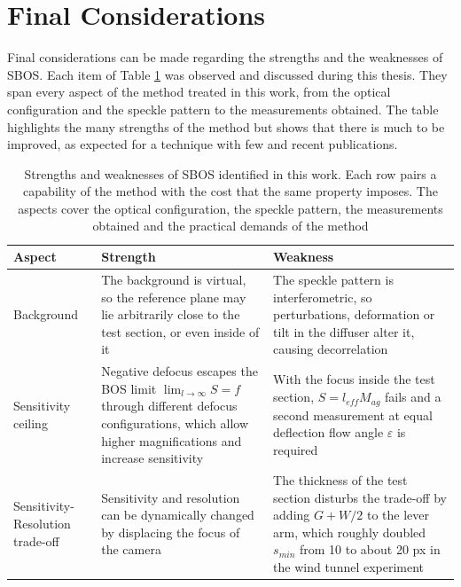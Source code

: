 \section{Final Considerations}
\label{section: Final Considerations}

Final considerations can be made regarding the strengths and the weaknesses of SBOS. Each item of Table \ref{tab: SBOS strengths and weaknesses} was observed and discussed during this thesis. They span every aspect of the method treated in this work, from the optical configuration and the speckle pattern to the measurements obtained. The table highlights the many strengths of the method but shows that there is much to be improved, as expected for a technique with few and recent publications.


\begin{table}[htbp]
    \centering
    \caption[Strengths and weaknesses of SBOS]{Strengths and weaknesses of SBOS identified in this work. Each row pairs a capability of the method with the cost that the same property imposes. The aspects cover the optical configuration, the speckle pattern, the measurements obtained and the practical demands of the method}
    \label{tab: SBOS strengths and weaknesses}
    \begin{tabularx}{\textwidth}{@{}>{\raggedright\arraybackslash}p{} >{\raggedright\arraybackslash}X >{\raggedright\arraybackslash}X@{}}
        \toprule
        Aspect & Strength & Weakness \\
        \midrule
        Background &
        The background is virtual, so the reference plane may lie arbitrarily close to the test section, or even inside of it &
        The speckle pattern is interferometric, so perturbations, deformation or tilt in the diffuser alter it, causing decorrelation \\
        \midrule

        Sensitivity ceiling &
        Negative defocus escapes the BOS limit $\lim_{l \to \infty} S = f$ through different defocus configurations, which allow higher magnifications and increase sensitivity&
        With the focus inside the test section, $S = l_{eff} M_{ag}$ fails and a second measurement at equal deflection flow angle  $\varepsilon$ is required  \\
        \midrule

        Sensitivity-Resolution trade-off &
        Sensitivity and resolution can be dynamically changed by displacing the focus of the camera &
        The thickness of the test section disturbs the trade-off by adding $G + W/2$ to the lever arm, which roughly doubled $s_{min}$ from 10 to about 20 px in the wind tunnel experiment \\
        \midrule


\end{tabularx}
\end{table}
